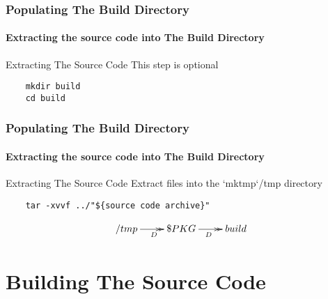 \documentclass[1pt,hyperref={pdfpagelabels=true}]{beamer}
\begin{document}
\begin{frame}[fragile]
  \frametitle{Populating The Build Directory}
  \framesubtitle{Extracting the source code into The Build Directory}
  
  \pause
  
  \begin{alertblock}{Extracting The Source Code}
    This step is optional
  \end{alertblock}
  
  \pause
  
  \begin{lstlisting}
    mkdir build
    cd build
  \end{lstlisting}
  
\end{frame}

\begin{frame}[fragile]
  \frametitle{Populating The Build Directory}
  \framesubtitle{Extracting the source code into The Build Directory}
    
  \begin{block}{Extracting The Source Code}
    Extract files into the `mktmp`/tmp directory
  \end{block}
  
  \pause
  
  \begin{lstlisting}
    tar -xvvf ../"${source code archive}"
  \end{lstlisting}
  
  \pause
  
  \begin{equation*}
    \xymatrix@C=2pc@R=2pc{
      \//tmp\ar@{->>}[r]_D & \/\$PKG\ar@{->>}[r]_D & \/build}
  \end{equation*}
  
\end{frame}

\section{Building The Source Code}
\end{document}
